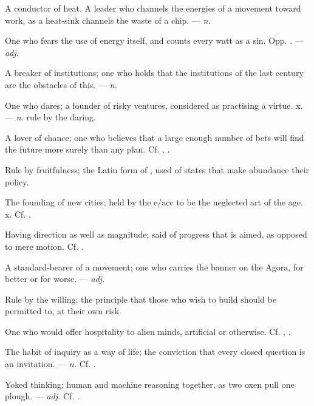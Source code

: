   A conductor of heat.   A leader who channels the energies of a movement toward work, as a heat-sink channels the waste of a chip. ---  \textit{n.}

 One who fears the use of energy itself, and counts every watt as a sin. Opp. . ---  \textit{adj.}

 A breaker of institutions; one who holds that the institutions of the last century are the obstacles of this. ---  \textit{n.}

 One who dares; a founder of risky ventures, considered as practising a virtue.   x. ---  \textit{n.} rule by the daring.

 A lover of chance; one who believes that a large enough number of bets will find the future more surely than any plan. Cf. , .

 Rule by fruitfulness; the Latin form of , used of states that make abundance their policy.

 The founding of new cities; held by the e/acc to be the neglected art of the age.   x. Cf. .

 Having direction as well as magnitude; said of progress that is aimed, as opposed to mere motion. Cf. .

 A standard-bearer of a movement; one who carries the banner on the Agora, for better or for worse. ---  \textit{adj.}

 Rule by the willing; the principle that those who wish to build should be permitted to, at their own risk.

 One who would offer hospitality to alien minds, artificial or otherwise. Cf. , .

 The habit of inquiry as a way of life; the conviction that every closed question is an invitation. ---  \textit{n.} Cf. .

 Yoked thinking; human and machine reasoning together, as two oxen pull one plough. ---  \textit{adj.} Cf. .
